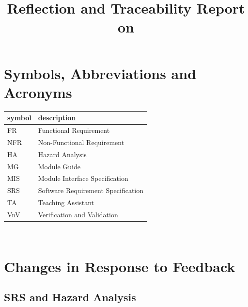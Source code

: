 \documentclass{article}
\title{Reflection and Traceability Report on \progname}
\author{\authname}
\date{}
\begin{document}
\maketitle

\newpage
\tableofcontents

\newpage

\listoftables
 
\listoffigures %
 
\section{Symbols, Abbreviations and Acronyms}
 
\renewcommand{\arraystretch}{1.2}
\begin{tabular}{l l}
  \toprule      
  \textbf{symbol} & \textbf{description}\\
  \midrule
  FR & Functional Requirement \\
  NFR & Non-Functional Requirement \\
  HA & Hazard Analysis \\
  MG & Module Guide \\
  MIS & Module Interface Specification \\
  SRS & Software Requirement Specification \\
  TA & Teaching Assistant \\
  VnV & Verification and Validation \\
  \bottomrule
\end{tabular}\\

\newpage


\section{Changes in Response to Feedback}
\subsection{SRS and Hazard Analysis}
\end{document}
